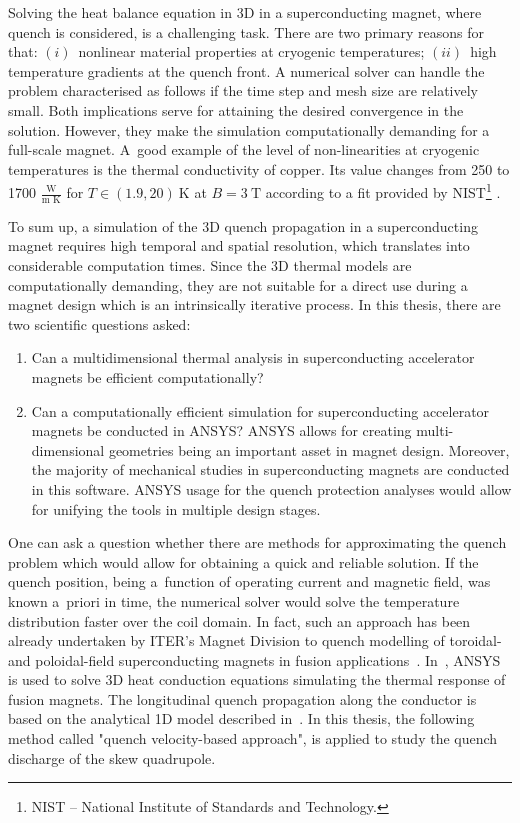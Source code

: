 
Solving the heat balance equation in 3D in a superconducting magnet, where quench is considered, is a challenging task. There are two primary reasons for that: $(i)$~nonlinear material properties at cryogenic temperatures; $(ii)$~high temperature gradients at the quench front. A numerical solver can handle the problem characterised as follows if the time step and mesh size are relatively small. Both implications serve for attaining the desired convergence in the solution. However, they make the simulation computationally demanding for a full-scale magnet. A~good example of the level of non-linearities at cryogenic temperatures is the thermal conductivity of copper. Its value changes from 250 to 1700 $\frac{\text{W}}{\text{m K}}$ for $T \in (1.9, 20)~\text{K}$ at $B=3~\text{T}$ according to a fit provided by NIST\footnote{NIST -- National Institute of Standards and Technology.} \cite[p.~9-13]{material_properties_roxie}. 

To sum up, a simulation of the 3D quench propagation in a superconducting magnet requires high temporal and spatial resolution, which translates into considerable computation times. Since the 3D thermal models are computationally demanding, they are not suitable for a direct use during a magnet design which is an intrinsically iterative process. In this thesis, there are two scientific questions asked:

\begin{enumerate}
\item Can a multidimensional thermal analysis in superconducting accelerator magnets be efficient computationally?
\item Can a computationally efficient simulation for superconducting accelerator magnets be conducted in ANSYS? ANSYS allows for creating multi-dimensional geometries being an important asset in magnet design. Moreover, the majority of mechanical studies in superconducting magnets are conducted in this software. ANSYS usage for the quench protection analyses would allow for unifying the tools in multiple design stages.
\end{enumerate}

One can ask a question whether there are methods for approximating the quench problem which would allow for obtaining a quick and reliable solution. If the quench position, being a~function of operating current and magnetic field, was known a~priori in time, the numerical solver would solve the temperature distribution faster over the coil domain. In fact, such an approach has been already undertaken by ITER's Magnet Division to quench modelling of toroidal- and poloidal-field superconducting magnets in fusion applications~\cite{iter_presentation_qualified_analysis}. In~\cite{iter_fault_case_study}, ANSYS is used to solve 3D heat conduction equations simulating the thermal response of fusion magnets. The longitudinal quench propagation along the conductor is based on the analytical 1D model described in~\cite{MIT_phd_thesis}. In this thesis, the following method called "quench velocity-based approach", is applied to study the quench discharge of the skew quadrupole.
